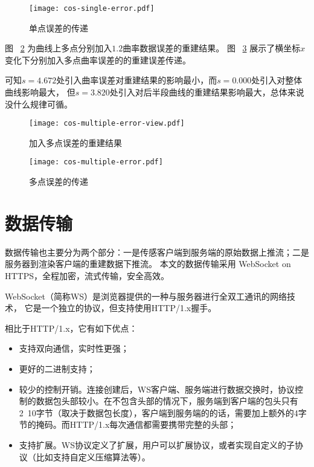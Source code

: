 \begin{figure}
\centering
\texttt{[image: cos-single-error.pdf]}
\caption{单点误差的传递}
\label{fig:cos-single-error}
\end{figure}

图 ~\ref{fig:cos-multiple-error-view} 为曲线上多点分别加入$1.2$曲率数据误差的重建结果。
图 ~\ref{fig:cos-multiple-error} 展示了横坐标$x$变化下分别加入多点曲率误差的的重建误差传递。

可知$s=4.672$处引入曲率误差对重建结果的影响最小，而$s=0.000$处引入对整体曲线影响最大，
但$s=3.820$处引入对后半段曲线的重建结果影响最大，总体来说没什么规律可循。

\begin{figure}
\centering
\texttt{[image: cos-multiple-error-view.pdf]}
\caption{加入多点误差的重建结果}
\label{fig:cos-multiple-error-view}
\end{figure}

\begin{figure}
\centering
\texttt{[image: cos-multiple-error.pdf]}
\caption{多点误差的传递}
\label{fig:cos-multiple-error}
\end{figure}

\section{数据传输}

数据传输也主要分为两个部分：一是传感客户端到服务端的原始数据上推流；二是服务器到渲染客户端的重建数据下推流。
本文的数据传输采用 WebSocket on HTTPS，全程加密，流式传输，安全高效。

WebSocket\cite{rfc6455}（简称WS）是浏览器提供的一种与服务器进行全双工通讯的网络技术，
它是一个独立的协议，但支持使用HTTP/1.x\cite{rfc7230}握手。

相比于HTTP/1.x，它有如下优点：

\begin{itemize}
    \item 支持双向通信，实时性更强；
    \item 更好的二进制支持；
    \item 较少的控制开销。连接创建后，WS客户端、服务端进行数据交换时，协议控制的数据包头部较小。在不包含头部的情况下，服务端到客户端的包头只有2~10字节（取决于数据包长度），客户端到服务端的的话，需要加上额外的4字节的掩码。而HTTP/1.x每次通信都需要携带完整的头部；
    \item 支持扩展。WS协议定义了扩展，用户可以扩展协议，或者实现自定义的子协议（比如支持自定义压缩算法等）。
\end{itemize}

